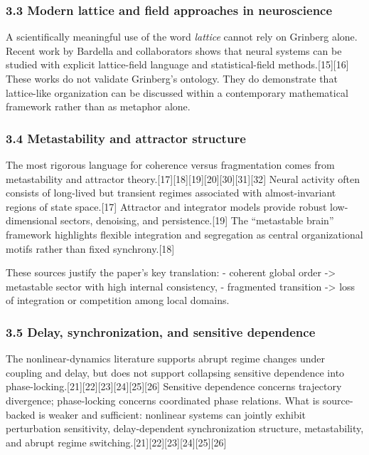 \documentclass[
]{article}
\begin{document}
\subsubsection{3.3 Modern lattice and field approaches in
neuroscience}\label{modern-lattice-and-field-approaches-in-neuroscience}

A scientifically meaningful use of the word \emph{lattice} cannot rely
on Grinberg alone. Recent work by Bardella and collaborators shows that
neural systems can be studied with explicit lattice-field language and
statistical-field methods.{[}15{]}{[}16{]} These works do not validate
Grinberg's ontology. They do demonstrate that lattice-like organization
can be discussed within a contemporary mathematical framework rather
than as metaphor alone.

\subsubsection{3.4 Metastability and attractor
structure}\label{metastability-and-attractor-structure}

The most rigorous language for coherence versus fragmentation comes from
metastability and attractor
theory.{[}17{]}{[}18{]}{[}19{]}{[}20{]}{[}30{]}{[}31{]}{[}32{]} Neural
activity often consists of long-lived but transient regimes associated
with almost-invariant regions of state space.{[}17{]} Attractor and
integrator models provide robust low-dimensional sectors, denoising, and
persistence.{[}19{]} The ``metastable brain'' framework highlights
flexible integration and segregation as central organizational motifs
rather than fixed synchrony.{[}18{]}

These sources justify the paper's key translation: - coherent global
order -\textgreater{} metastable sector with high internal consistency,
- fragmented transition -\textgreater{} loss of integration or
competition among local domains.

\subsubsection{3.5 Delay, synchronization, and sensitive
dependence}\label{delay-synchronization-and-sensitive-dependence}

The nonlinear-dynamics literature supports abrupt regime changes under
coupling and delay, but does not support collapsing sensitive dependence
into phase-locking.{[}21{]}{[}22{]}{[}23{]}{[}24{]}{[}25{]}{[}26{]}
Sensitive dependence concerns trajectory divergence; phase-locking
concerns coordinated phase relations. What is source-backed is weaker
and sufficient: nonlinear systems can jointly exhibit perturbation
sensitivity, delay-dependent synchronization structure, metastability,
and abrupt regime
switching.{[}21{]}{[}22{]}{[}23{]}{[}24{]}{[}25{]}{[}26{]}
\end{document}
